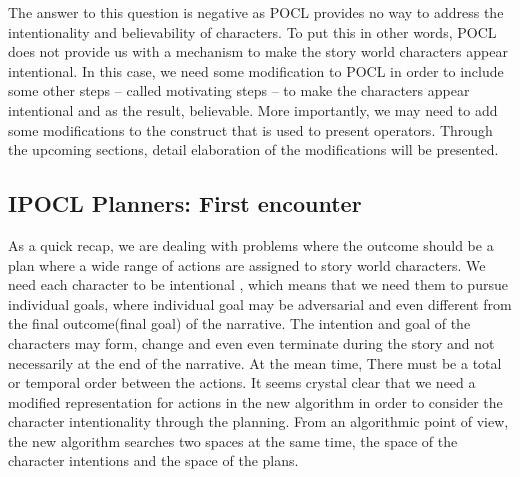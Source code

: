 \documentclass[english]{tktltiki}
\begin{document}
The answer to this question is negative as POCL provides no way to address the intentionality and believability of characters. To put this in other words, POCL does not provide us with a mechanism to make the story world characters appear intentional. In this case, we need some modification to POCL in order to include some other steps -- called motivating steps -- to make the characters appear intentional and as the result, believable. More importantly, we may need to add some modifications to the construct that is used to present operators. Through the upcoming sections, detail elaboration of the modifications will be presented.
\subsection{IPOCL Planners: First encounter}
As a quick recap, we are dealing with problems where the outcome should be a plan where a wide range of actions are assigned to story world characters. We need each character to be intentional , which means that we need them to pursue individual goals, where individual goal may be adversarial and even different from the final outcome(final goal) of the narrative. The intention and goal of the characters may form, change and even even terminate during the story and not necessarily at the end of the narrative. At the mean time, There must be a total or temporal order between the actions. 
It seems crystal clear that we need a modified representation for actions in the new algorithm in order to consider the character intentionality through the planning. From an algorithmic point of view, the new algorithm searches two spaces at the same time, the space of the character intentions and the space of the plans. 
\end{document}
